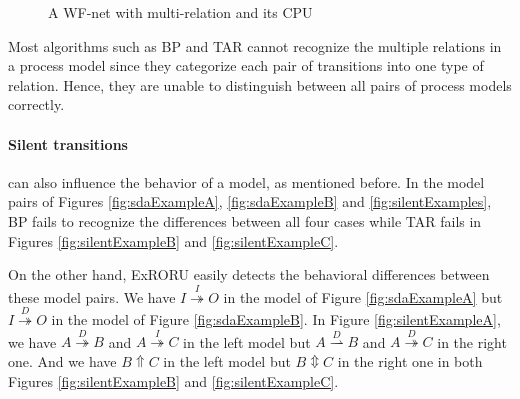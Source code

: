 \documentclass{llncs}
\begin{document}
\begin{figure}[htbp]
\centering
{}
\caption{A WF-net with multi-relation and its CPU\label{fig:exampleMultiRelation}}
\end{figure}

Most algorithms such as BP and TAR cannot recognize the multiple relations in a process model since they categorize each pair of transitions into one type of relation. Hence, they are unable to distinguish between all pairs of process models correctly.

\paragraph{\textbf{Silent transitions}} can also influence the behavior of a model, as mentioned before. In the model pairs of Figures \ref{fig:sdaExampleA}, \ref{fig:sdaExampleB} and \ref{fig:silentExamples}, BP fails to recognize the differences between all four cases while TAR fails in Figures \ref{fig:silentExampleB} and \ref{fig:silentExampleC}. 

On the other hand, ExRORU easily detects the behavioral differences between these model pairs. We have $I\overset{I}{\twoheadrightarrow}O$ in the model of Figure \ref{fig:sdaExampleA} but $I\overset{D}{\twoheadrightarrow}O$ in the model of Figure \ref{fig:sdaExampleB}. In Figure \ref{fig:silentExampleA}, we have $A\overset{D}{\twoheadrightarrow}B$ and $A\overset{I}{\twoheadrightarrow}C$ in the left model but $A\overset{D}{\rightharpoonup}B$ and $A\overset{D}{\twoheadrightarrow}C$ in the right one. And we have $B\Uparrow C$ in the left model but $B\Updownarrow C$ in the right one in both Figures \ref{fig:silentExampleB} and \ref{fig:silentExampleC}.
\end{document}
